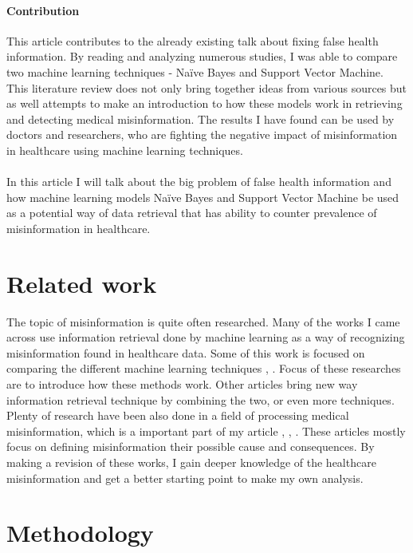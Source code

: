 \documentclass[11pt ,english,a4paper]{article}
\begin{document}
\paragraph {Contribution} This article contributes to the already existing talk about fixing false health information. By reading and analyzing numerous studies, I was able to compare two machine learning techniques - Naïve Bayes and Support Vector Machine. This literature review does not only bring together ideas from various sources but as well attempts to make an introduction to how these models work in retrieving and detecting medical misinformation. The results I have found can be used by doctors and researchers, who are fighting the negative impact of misinformation in healthcare using machine learning techniques. 

\paragraph {} In this article I will talk about the big problem of false health information and how machine learning models Naïve Bayes and Support Vector Machine be used as a potential way of data retrieval that has ability to counter prevalence of misinformation in healthcare.

\section{Related work}

The topic of misinformation is quite often researched. Many of the works I came across use information retrieval done by machine learning as a way of recognizing misinformation found in healthcare data. Some of this work is focused on comparing the different machine learning techniques \cite{sha20mach}, \cite{pod19mach}. Focus of these researches are to introduce how these methods work. Other articles bring new way information retrieval technique \cite{chap22unmask} by combining the two, or even more techniques. Plenty of research have been also done in a field of processing medical misinformation, which is a important part of my article \cite{gu20misinfo}, \cite{cook15misinfo}, \cite{wa19sys}. These articles mostly focus on defining misinformation their possible cause and consequences. By making a revision of these works, I gain deeper knowledge of the healthcare misinformation and get a better starting point to make my own analysis.

\section{Methodology}\label{methodology}
\end{document}
